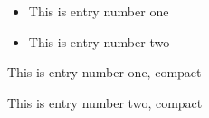 \documentclass{article}
\begin{document}
\lipsum[1]
\begin{itemize}
	\item This is entry number one
	\item This is entry number two
\end{itemize}
\lipsum[2]
\begin{compactitem}
	\item This is entry number one, compact
	\item This is entry number two, compact
\end{compactitem}
\lipsum[3]
\end{document}
